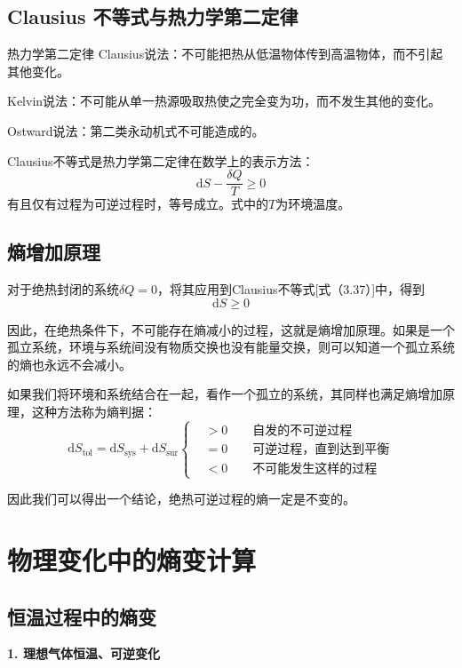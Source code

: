 \documentclass[lang=cn,newtx,11pt,scheme=chinese]{elegantbook}
\begin{document}
\subsection{Clausius 不等式与热力学第二定律}
\begin{theorem}{热力学第二定律}
	Clausius说法：不可能把热从低温物体传到高温物体，而不引起其他变化。
	
	Kelvin说法：不可能从单一热源吸取热使之完全变为功，而不发生其他的变化。
	
	Ostward说法：第二类永动机式不可能造成的。
\end{theorem}

Clausius不等式是热力学第二定律在数学上的表示方法：
\begin{equation}
	\mathrm{d}S-\frac{\delta Q}{T}\geqslant 0 
\end{equation}
有且仅有过程为可逆过程时，等号成立。式中的$T$为环境温度。

\subsection{熵增加原理}
对于绝热封闭的系统$\delta Q=0$，将其应用到Clausius不等式[式（3.37）]中，得到
\begin{equation}
	\mathrm{d}S \geqslant 0
\end{equation}

因此，在绝热条件下，不可能存在熵减小的过程，这就是熵增加原理。如果是一个孤立系统，环境与系统间没有物质交换也没有能量交换，则可以知道一个孤立系统的熵也永远不会减小。

如果我们将环境和系统结合在一起，看作一个孤立的系统，其同样也满足熵增加原理，这种方法称为熵判据：
\begin{equation}
	\mathrm{d}S_{\mathrm{tol}} = \mathrm{d}S_{\mathrm{sys}} + \mathrm{d}S_{\mathrm{sur}} \left\{
	\begin{aligned}
		&> 0 \qquad \text{自发的不可逆过程} \\
		&= 0 \qquad \text{可逆过程，直到达到平衡}\\
		&< 0 \qquad \text{不可能发生这样的过程} 
	\end{aligned}
\right.
\end{equation}

因此我们可以得出一个结论，绝热可逆过程的熵一定是不变的。

\section{物理变化中的熵变计算}

\subsection{恒温过程中的熵变}
\textbf{1. 理想气体恒温、可逆变化}
\end{document}
